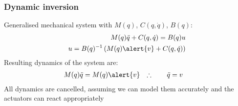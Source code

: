 \documentclass{beamer-control}
\begin{document}
\begin{frame}
\frametitle{Dynamic inversion}
Generalised mechanical system with $M(q)$, $C(q,\dot q)$, $B(q)$:
\begin{align}
M(q)\ddot q + C(q,\dot q) = B(q) u \\
u = B(q)^{-1} \left( M(q) \alert{v} + C(q,\dot q) \right)
\end{align}
Resulting dynamics of the system are:
\begin{align}
M(q)\ddot q &= M(q) \alert{v} & \therefore\qquad \ddot q &= v
\end{align}
All dynamics are cancelled, assuming we can model them accurately and the actuators can react appropriately
\end{frame}

\SUMMARYFRAME
\FINALE
\end{document}
